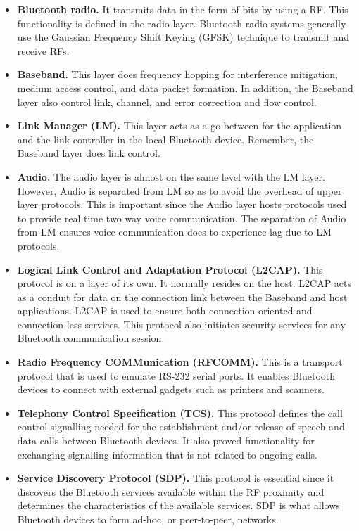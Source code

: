 \documentclass[12pt,svgnames,smaller]{article} %
\begin{document}
\begin{enumerate}
		\begin{itemize}
			\item \textbf{Bluetooth radio.} It transmits data in the form of bits by using a RF. This functionality is defined in the radio layer. Bluetooth radio systems generally use the Gaussian Frequency Shift Keying (GFSK) technique to transmit and receive RFs.
			\item \textbf{Baseband.}  This layer does frequency hopping for interference mitigation, medium access control, and data packet formation. In addition, the Baseband layer also control link, channel, and error correction and flow control.
			\item \textbf{Link Manager (LM).} This layer acts as a go-between for the application and the link controller in the local Bluetooth device. Remember, the Baseband layer does link control. 
			\item \textbf{Audio.} The audio layer is almost on the same level with the LM layer. However, Audio is separated from LM so as to avoid the overhead of upper layer protocols. This is important since the Audio layer hosts protocols used to provide real time two way voice communication. The separation of Audio from LM ensures voice communication does to experience lag due to LM protocols.
			\item \textbf{Logical Link Control and Adaptation Protocol (L2CAP).} This protocol is on a layer of its own. It normally resides on the host. L2CAP acts as a conduit for data on the connection link between the Baseband and host applications. L2CAP is used to ensure both connection-oriented and connection-less services. This protocol also initiates security services for any Bluetooth communication session.
			\item \textbf{Radio Frequency COMMunication (RFCOMM).} This is a transport protocol that is used to emulate RS-232 serial ports. It enables Bluetooth devices to connect with external gadgets such as printers and scanners.
			\item \textbf{Telephony Control Specification (TCS).} This protocol defines the call control signalling needed for the establishment and/or release of speech and data calls between Bluetooth devices. It also proved functionality for exchanging signalling information that is not related to ongoing calls.
			\item \textbf{Service Discovery Protocol (SDP).} This protocol is essential since it discovers the Bluetooth services available within the RF proximity and determines the characteristics of the available services. SDP is what allows Bluetooth devices to form ad-hoc, or peer-to-peer, networks.

\end{itemize}
\end{enumerate}
\end{document}
